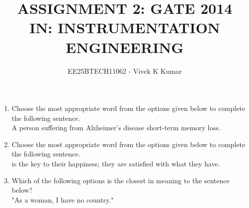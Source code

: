 \documentclass[journal,12pt,onecolumn]{IEEEtran}
\theoremstyle{remark}
\begin{document}
\title{
ASSIGNMENT 2: GATE 2014 \\
IN: INSTRUMENTATION ENGINEERING}
\author{EE25BTECH11062 - Vivek K Kumar}
\date{}
\maketitle

\begin{enumerate}

    \item Choose the most appropriate word from the options given below to complete the following sentence.\\

    
    A person suffering from Alzheimer's disease \underline{\hspace{2cm}} short-term memory loss.
   
    \hfill{}
    \begin{enumerate}
    \end{enumerate}

    \item Choose the most appropriate word from the options given below to complete the following sentence. \\
    \underline{\hspace{2cm}} is the key to their happiness; they are satisfied with what they have.

    \hfill{}
        \begin{enumerate}
        \end{enumerate}

    \item Which of the following options is the closest in meaning to the sentence below? \\
    "As a woman, I have no country."


\end{enumerate}
\end{document}

